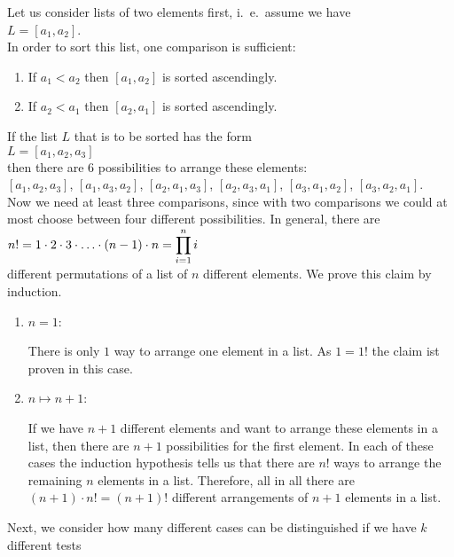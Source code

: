 Let us consider lists of two elements first, i.~e.~assume we have
\\[0.2cm]
\hspace*{1.3cm}
$L = [a_1, a_2]$.  
\\[0.2cm]
In order to sort this list, one comparison is sufficient:
\begin{enumerate}
 \item If $a_1 < a_2$ then $[a_1, a_2]$ is sorted ascendingly.
 \item If $a_2 < a_1$ then $[a_2, a_1]$ is sorted ascendingly.
\end{enumerate}
If the list $L$ that is to be sorted has the form
\\[0.2cm]
\hspace*{1.3cm}
$L = [a_1,a_2,a_3]$ 
\\[0.2cm]
then there are 6 possibilities to arrange these elements:
\\[0.2cm]
\hspace*{0.3cm}
$[a_1,a_2,a_3]$, \quad
$[a_1,a_3,a_2]$, \quad
$[a_2,a_1,a_3]$, \quad
$[a_2,a_3,a_1]$, \quad
$[a_3,a_1,a_2]$, \quad
$[a_3,a_2,a_1]$. 
\\[0.2cm]
Now we need at least three comparisons, since with two comparisons we could at most choose between
four different possibilities.
In general, there are 
\\[0.2cm]
\hspace*{1.3cm}
$\displaystyle n! = 1 \cdot 2 \cdot 3 \cdot {\dots} \cdot (n-1) \cdot n = \prod\limits_{i=1}^n i$ 
\\[0.2cm]
different permutations of a list of $n$ different elements. 
We prove this claim by induction. 
\begin{enumerate}
\item $n=1$:  

      There is only $1$ way to arrange one element in a list.  As $1 = 1!$ the claim ist proven
      in this case.
\item $n \mapsto n+1$:
  
      If we have $n+1$ different elements and want to arrange these elements in a list, then there
      are $n+1$ possibilities for the first element.  In each of these cases the induction
      hypothesis tells us that there are $n!$ ways to arrange the remaining $n$ elements in a list.
      Therefore, all in all there are $(n+1) \cdot n! = (n+1)!$ different arrangements of $n+1$
      elements in a list.
\end{enumerate}
Next, we consider how many different cases can be distinguished if we have $k$ different tests

